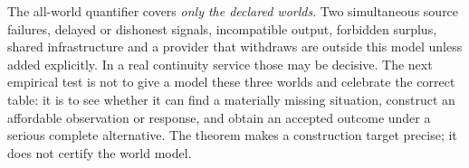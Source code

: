 The all-world quantifier covers \emph{only the declared worlds}. Two simultaneous source failures, delayed or dishonest signals, incompatible output, forbidden surplus, shared infrastructure and a provider that withdraws are outside this model unless added explicitly. In a real continuity service those may be decisive. The next empirical test is not to give a model these three worlds and celebrate the correct table: it is to see whether it can find a materially missing situation, construct an affordable observation or response, and obtain an accepted outcome under a serious complete alternative. The theorem makes a construction target precise; it does not certify the world model.
